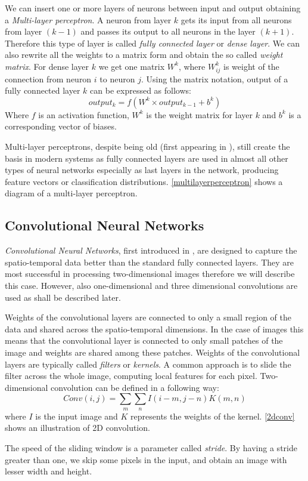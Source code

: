We can insert one or more layers of neurons between input and output obtaining a \textit{Multi-layer perceptron}. A neuron from layer $k$ gets its input from all neurons from layer $(k-1)$ and passes its output to all neurons in the layer $(k+1)$. Therefore this type of layer is called \textit{fully connected layer} or \textit{dense layer}.  We can also rewrite all the weights to a matrix form and obtain the so called \textit{weight matrix}. For dense layer $k$ we get one matrix $W^k$, where $W_{ij}^k$ is weight of the connection from neuron $i$ to neuron $j$. Using the matrix notation, output of a fully connected layer $k$ can be expressed as follows: 
$$output_k = f(W^k \times output_{k-1} + b^k)$$
Where $f$ is an activation function, $W^k$ is the weight matrix for layer $k$ and $b^k$ is a corresponding vector of biases.\par  
Multi-layer perceptrons, despite being old (first appearing in \cite{rosenblatt_principles_1961}), still create the basis in modern systems as fully connected layers are used in almost all other types of neural networks especially as last layers in the network, producing feature vectors or classification distributions. \autoref{multilayerperceptron} shows a diagram of a multi-layer perceptron.



\subsection{Convolutional Neural Networks}
\textit{Convolutional Neural Networks}, first introduced in \cite{lecun_backpropagation_1989}, are designed to capture the spatio-temporal data better than the standard fully connected layers. They are most successful in processing two-dimensional images therefore we will describe this case. However, also one-dimensional and three dimensional convolutions are used as shall be described later.  \par
Weights of the convolutional layers are connected to only a small region of the data and shared across the spatio-temporal dimensions. In the case of images this means that the convolutional layer is connected to only small patches of the image and weights are shared among these patches. Weights of the convolutional layers are typically called \textit{filters} or \textit{kernels}. A common approach is to slide the filter across the whole image,  computing local features for each pixel.
Two-dimensional convolution can be defined in a following way:
$$Conv(i,j) = \sum_m {\sum_n {I(i-m,j-n)K(m,n)}}$$ where $I$ is the input image and $K$ represents the weights of the kernel. \autoref{2dconv} shows an illustration of 2D convolution. \par
The speed of the sliding window is a parameter called \textit{stride}. By having a stride greater than one, we skip some pixels in the input, and obtain an image with lesser width and height.\par 

